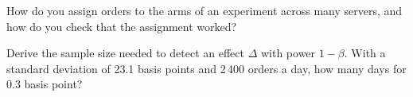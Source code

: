 \begin{interviewq}\label{iq:rs:live-experiments:5}
How do you assign orders to the arms of an experiment across many servers, and how do you check that the assignment worked?
\end{interviewq}

\begin{interviewq}\label{iq:rs:live-experiments:6}
Derive the sample size needed to detect an effect $\Delta$ with power $1-\beta$. With a standard deviation of 23.1 basis points and 2\,400 orders a day, how
many days for 0.3 basis point?
\end{interviewq}
